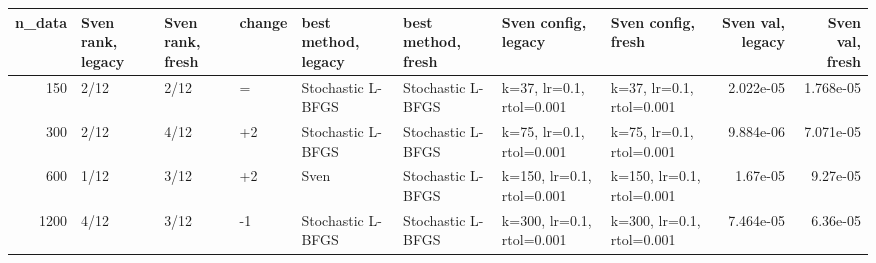 \begin{tabular}{rlllllllrr}
\toprule
n\_data & Sven rank, legacy & Sven rank, fresh & change & best method, legacy & best method, fresh & Sven config, legacy & Sven config, fresh & Sven val, legacy & Sven val, fresh \\
\midrule
150 & 2/12 & 2/12 & = & Stochastic L-BFGS & Stochastic L-BFGS & k=37, lr=0.1, rtol=0.001 & k=37, lr=0.1, rtol=0.001 & 2.022e-05 & 1.768e-05 \\
300 & 2/12 & 4/12 & +2 & Stochastic L-BFGS & Stochastic L-BFGS & k=75, lr=0.1, rtol=0.001 & k=75, lr=0.1, rtol=0.001 & 9.884e-06 & 7.071e-05 \\
600 & 1/12 & 3/12 & +2 & Sven & Stochastic L-BFGS & k=150, lr=0.1, rtol=0.001 & k=150, lr=0.1, rtol=0.001 & 1.67e-05 & 9.27e-05 \\
1200 & 4/12 & 3/12 & -1 & Stochastic L-BFGS & Stochastic L-BFGS & k=300, lr=0.1, rtol=0.001 & k=300, lr=0.1, rtol=0.001 & 7.464e-05 & 6.36e-05 \\
\bottomrule
\end{tabular}
